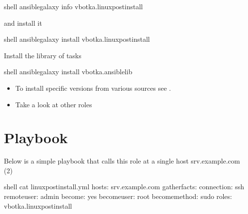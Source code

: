 \documentclass[letterpaper,10pt,english]{sphinxmanual}
\begin{document}
%
\begin{sphinxVerbatim}[commandchars=\\\{\}]
shell\PYGZgt{} ansible\PYGZhy{}galaxy info vbotka.linux\PYGZus{}postinstall
\end{sphinxVerbatim}
\sphinxresetverbatimhllines

and install it

%
\begin{sphinxVerbatim}[commandchars=\\\{\}]
 shell\PYGZgt{} ansible\PYGZhy{}galaxy install vbotka.linux\PYGZus{}postinstall
\end{sphinxVerbatim}
\sphinxresetverbatimhllines

Install the library of tasks

%
\begin{sphinxVerbatim}[commandchars=\\\{\}]
 shell\PYGZgt{} ansible\PYGZhy{}galaxy install vbotka.ansible\PYGZus{}lib
\end{sphinxVerbatim}
\sphinxresetverbatimhllines



\begin{itemize}
\item {} 
To install specific versions from various sources see .

\item {} 
Take a look at other roles 

\end{itemize}




\section{Playbook}
\label{\detokenize{guide:playbook}}\label{\detokenize{guide:ug-playbook}}
Below is a simple playbook that calls this role at a single host
srv.example.com (2)

%
\begin{sphinxVerbatim}[commandchars=\\\{\},numbers=left,firstnumber=1,stepnumber=1]
shell\PYGZgt{} cat linux\PYGZhy{}postinstall.yml
\PYGZhy{} hosts: srv.example.com
  gather\PYGZus{}facts: 
  connection: ssh
  remote\PYGZus{}user: admin
  become: yes
  become\PYGZus{}user: root
  become\PYGZus{}method: sudo
  roles:
    \PYGZhy{} vbotka.linux\PYGZus{}postinstall
\end{sphinxVerbatim}
\sphinxresetverbatimhllines
\end{document}
